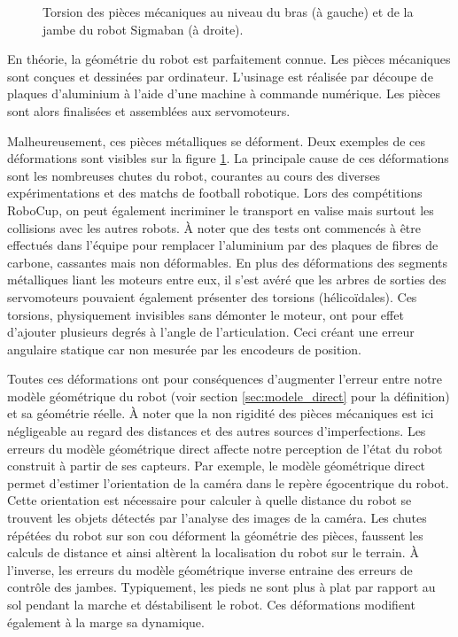 \begin{figure}[htb]
\begin{subfigure}{0.4\paperwidth}
    \end{subfigure}
    \caption{\label{fig:robot_meca_twist} 
        Torsion des pièces mécaniques au niveau du bras (à gauche) 
        et de la jambe du robot Sigmaban (à droite).
    }
\end{figure}

En théorie, la géométrie du robot est parfaitement connue.
Les pièces mécaniques sont conçues et dessinées par ordinateur.
L'usinage est réalisée par découpe de plaques d'aluminium à l'aide 
d'une machine à commande numérique.
Les pièces sont alors finalisées et assemblées aux servomoteurs.

Malheureusement, ces pièces métalliques se déforment.
Deux exemples de ces déformations sont visibles sur la figure \ref{fig:robot_meca_twist}.
La principale cause de ces déformations sont les nombreuses chutes du robot,
courantes au cours des diverses expérimentations et des matchs de football robotique.
Lors des compétitions RoboCup, on peut également incriminer le transport en valise
mais surtout les collisions avec les autres robots.
À noter que des tests ont commencés à être effectués dans l'équipe pour remplacer
l'aluminium par des plaques de fibres de carbone, cassantes mais non déformables.
En plus des déformations des segments métalliques liant les moteurs entre eux, 
il s'est avéré que les arbres de sorties des servomoteurs pouvaient également
présenter des torsions (hélicoïdales).
Ces torsions, physiquement invisibles sans démonter le moteur, 
ont pour effet d'ajouter plusieurs degrés à l'angle de l'articulation.
Ceci créant une erreur angulaire statique car non mesurée par les encodeurs 
de position.

Toutes ces déformations ont pour conséquences d'augmenter l'erreur entre
notre modèle géométrique du robot (voir section \ref{sec:modele_direct} pour la définition)
et sa géométrie réelle.
À noter que la non rigidité des pièces mécaniques est ici négligeable
au regard des distances et des autres sources d'imperfections.
Les erreurs du modèle géométrique direct affecte notre perception 
de l'état du robot construit à partir de ses capteurs.
Par exemple, le modèle géométrique direct permet d'estimer l'orientation de
la caméra dans le repère égocentrique du robot.
Cette orientation est nécessaire pour calculer à quelle distance du robot 
se trouvent les objets détectés par l'analyse des images de la caméra.
Les chutes répétées du robot sur son cou déforment la géométrie des pièces,
faussent les calculs de distance et ainsi altèrent la localisation du robot sur le terrain.
À l'inverse, les erreurs du modèle géométrique inverse entraine des erreurs
de contrôle des jambes.
Typiquement, les pieds ne sont plus à plat par rapport au sol pendant la marche
et déstabilisent le robot.
Ces déformations modifient également à la marge sa dynamique.

